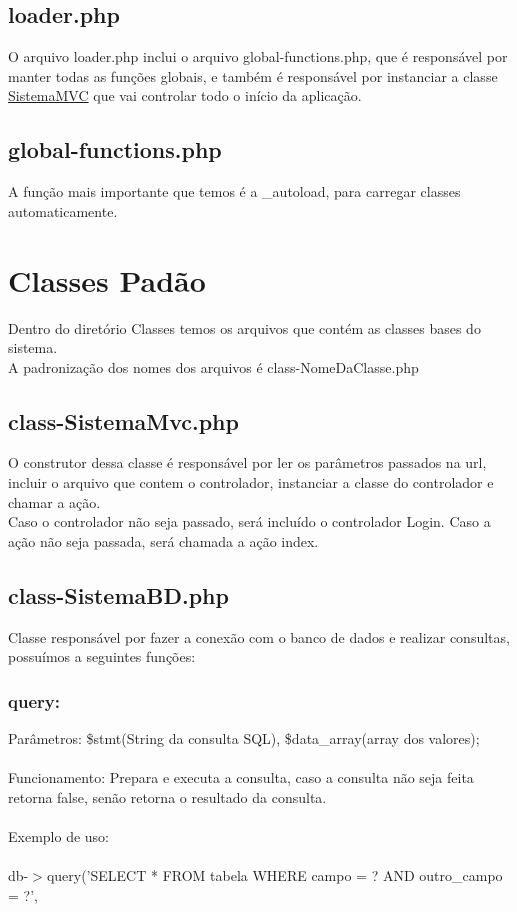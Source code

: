 \documentclass{article}
\begin{document}
\subsection{loader.php} \label{sec:loader}
O arquivo loader.php inclui o arquivo global-functions.php, que é responsável por manter todas as funções globais, e também é responsável por instanciar a classe \hyperref[sec:SistemaMVC]{SistemaMVC} que vai controlar todo o início da aplicação.

\subsection{global-functions.php} \label{sec:global-functions}
A função mais importante que temos é a \_autoload, para carregar classes automaticamente.

\newpage
\section{Classes Pad\~ao}
	Dentro do diretório Classes temos os arquivos que contém as classes bases do sistema.\\
	A padronização dos nomes dos arquivos é class-NomeDaClasse.php

	\subsection{class-SistemaMvc.php} \label{sec:SistemaMVC}
		O construtor dessa classe é responsável por ler os parâmetros passados na url, incluir o arquivo que contem o 			controlador, instanciar a classe do controlador e chamar a ação.\\
		Caso o controlador não seja passado, será incluído o controlador Login.
		Caso a ação não seja passada, será chamada a ação index.

	\subsection{class-SistemaBD.php} \label{sec:SistemaBD}
		Classe responsável por fazer a conexão com o banco de dados e realizar consultas, possuímos a seguintes funções:

		\subsubsection{query:}
			Parâmetros: \$stmt(String da consulta SQL), \$data\_array(array dos valores);\\\\
			Funcionamento: Prepara e executa a consulta, caso a consulta não seja feita retorna false, senão retorna o 				resultado da consulta.\\\\
			Exemplo de uso:\\\\
			db-$>$query('SELECT * FROM tabela WHERE campo = ? AND outro\_campo = ?',
			
\end{document}
